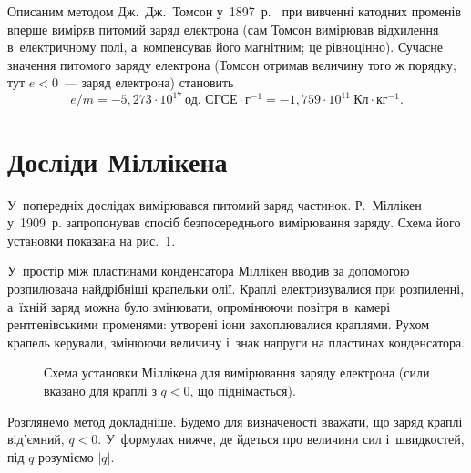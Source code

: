 Описаним методом Дж.~Дж.~Томсон у~1897~р.~\cite{Thomson1897} при вивченні катодних променів вперше виміряв питомий заряд електрона (сам Томсон вимірював відхилення в~електричному полі, а~компенсував його магнітним; це рівноцінно). Сучасне значення питомого заряду електрона (Томсон отримав величину того ж порядку; тут $e < 0$~--- заряд електрона) становить
\begin{equation}\label{eq:e_m_value}
	e/m = -5{,}273 \cdot 10^{17} \ \text{од.~СГСЕ} \cdot \text{г}^{-1}
	= -1{,}759 \cdot 10^{11} \ \text{Кл} \cdot \text{кг}^{-1}.
\end{equation}


\section{Досліди Міллікена}\hypertarget{millikan-experiment}{}

У~попередніх дослідах вимірювався питомий заряд частинок. Р.~Міллікен у~1909~р. запропонував спосіб безпосереднього вимірювання заряду. Схема його установки показана на рис.~\ref{tikz:Millikan}.

У~простір між пластинами конденсатора Міллікен вводив за допомогою розпилювача найдрібніші крапельки олії. Краплі електризувалися при розпиленні, а~їхній заряд можна було змінювати, опромінюючи повітря в~камері рентгенівськими променями: утворені іони захоплювалися краплями. Рухом крапель керували, змінюючи величину і~знак напруги на пластинах конденсатора.

\begin{figure}[h!]
	\centering
	\caption{Схема установки Міллікена для вимірювання заряду електрона (сили вказано для краплі з $q < 0$, що піднімається).}
	\label{tikz:Millikan}
\end{figure}

Розглянемо метод докладніше. Будемо для визначеності вважати, що заряд краплі від'ємний, $q < 0$. У~формулах нижче, де йдеться про величини сил і~швидкостей, під $q$ розуміємо $|q|$.

